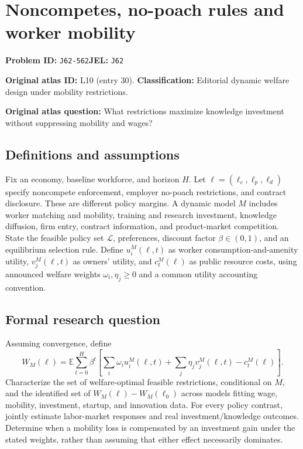 \documentclass[11pt,a4paper]{article}
\begin{document}
\section*{Noncompetes, no-poach rules and worker mobility}
\textbf{Problem ID:} \texttt{J62-562}\quad \textbf{JEL:} \texttt{J62}\par
\label{problem:OP-0030}
\label{atlas:prob:L10}
\noindent\textbf{Original atlas ID:} L10 (entry 30). \textbf{Classification:} Editorial dynamic welfare design under mobility restrictions.

\noindent\textbf{Original atlas question:} What restrictions maximize knowledge investment without suppressing mobility and wages?

\subsection*{Definitions and assumptions}
Fix an economy, baseline workforce, and horizon $H$. Let $\ell=(\ell_c,\ell_p,\ell_d)$ specify noncompete enforcement, employer no-poach restrictions, and contract disclosure. These are different policy margins. A dynamic model $M$ includes worker matching and mobility, training and research investment, knowledge diffusion, firm entry, contract information, and product-market competition. State the feasible policy set $\mathcal L$, preferences, discount factor $\beta\in(0,1)$, and an equilibrium selection rule. Define $u_i^M(\ell,t)$ as worker consumption-and-amenity utility, $v_j^M(\ell,t)$ as owners' utility, and $c_t^M(\ell)$ as public resource costs, using announced welfare weights $\omega_i,\eta_j\geq0$ and a common utility accounting convention.
\subsection*{Formal research question}
Assuming convergence, define
\[
 W_M(\ell)=\mathbb E\sum_{t=0}^{H}\beta^t
   \left[\sum_i\omega_i u_i^M(\ell,t)
        +\sum_j\eta_j v_j^M(\ell,t)-c_t^M(\ell)\right].
\]
Characterize the set of welfare-optimal feasible restrictions, conditional on $M$, and the identified set of $W_M(\ell)-W_M(\ell_0)$ across models fitting wage, mobility, investment, startup, and innovation data. For every policy contrast, jointly estimate labor-market responses and real investment/knowledge outcomes. Determine when a mobility loss is compensated by an investment gain under the stated weights, rather than assuming that either effect necessarily dominates.
\end{document}
